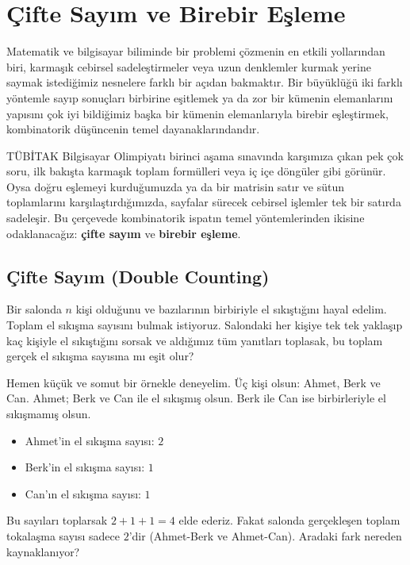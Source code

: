 \chapter[Çifte Sayım ve Birebir Eşleme · \textit{İleri}]{Çifte Sayım ve Birebir Eşleme}

Matematik ve bilgisayar biliminde bir problemi çözmenin en etkili yollarından biri, karmaşık cebirsel sadeleştirmeler veya uzun denklemler kurmak yerine saymak istediğimiz nesnelere farklı bir açıdan bakmaktır. Bir büyüklüğü iki farklı yöntemle sayıp sonuçları birbirine eşitlemek ya da zor bir kümenin elemanlarını yapısını çok iyi bildiğimiz başka bir kümenin elemanlarıyla birebir eşleştirmek, kombinatorik düşüncenin temel dayanaklarındandır.

TÜBİTAK Bilgisayar Olimpiyatı birinci aşama sınavında karşımıza çıkan pek çok soru, ilk bakışta karmaşık toplam formülleri veya iç içe döngüler gibi görünür. Oysa doğru eşlemeyi kurduğumuzda ya da bir matrisin satır ve sütun toplamlarını karşılaştırdığımızda, sayfalar sürecek cebirsel işlemler tek bir satırda sadeleşir. Bu çerçevede kombinatorik ispatın temel yöntemlerinden ikisine odaklanacağız: \textbf{çifte sayım} ve \textbf{birebir eşleme}.

\section{Çifte Sayım (Double Counting)}

Bir salonda $n$ kişi olduğunu ve bazılarının birbiriyle el sıkıştığını hayal edelim. Toplam el sıkışma sayısını bulmak istiyoruz. Salondaki her kişiye tek tek yaklaşıp kaç kişiyle el sıkıştığını sorsak ve aldığımız tüm yanıtları toplasak, bu toplam gerçek el sıkışma sayısına mı eşit olur?

Hemen küçük ve somut bir örnekle deneyelim. Üç kişi olsun: Ahmet, Berk ve Can.
Ahmet; Berk ve Can ile el sıkışmış olsun. Berk ile Can ise birbirleriyle el sıkışmamış olsun.
\begin{itemize}
    \item Ahmet'in el sıkışma sayısı: $2$
    \item Berk'in el sıkışma sayısı: $1$
    \item Can'ın el sıkışma sayısı: $1$
\end{itemize}
Bu sayıları toplarsak $2 + 1 + 1 = 4$ elde ederiz. Fakat salonda gerçekleşen toplam tokalaşma sayısı sadece $2$'dir (Ahmet-Berk ve Ahmet-Can). Aradaki fark nereden kaynaklanıyor?

